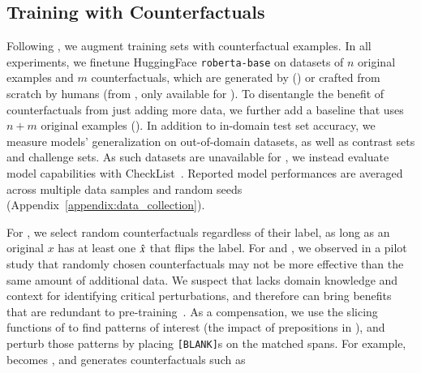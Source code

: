\subsection{Training with Counterfactuals}

\label{subsec:augmentation}
Following \citet{kaushik2019learning}, we augment training sets with counterfactual examples.
In all experiments, we finetune HuggingFace \texttt{roberta-base} on datasets of $n$ original examples and $m$ counterfactuals, which are generated by \sysname (\maug) or crafted from scratch by humans (\mcad from \citet{kaushik2019learning}, only available for \nli). To disentangle the benefit of counterfactuals from just adding more data, we further add a baseline that uses $n+m$ original examples (\mcomp).
In addition to in-domain test set accuracy, we measure models' generalization on out-of-domain datasets, as well as contrast sets and challenge sets. As such datasets are unavailable for \qqp, we instead evaluate model capabilities with CheckList~\cite{checklist:acl20}.
Reported model performances are averaged across multiple data samples and random seeds (Appendix~\ref{appendix:data_collection}).



For \sst, we select random \sysname counterfactuals regardless of their label, as long as an original $x$ has at least one $\hat{x}$ that flips the label.
For \nli and \qqp, we observed in a pilot study that randomly chosen counterfactuals may not be more effective than the same amount of additional data.
We suspect that \sysname lacks domain knowledge and context for identifying critical perturbations, and therefore can bring benefits that are redundant to pre-training~\cite{longpre2020effective}.
As a compensation, we use the slicing functions of \citet{chen2019slice} to find patterns of interest (\eg the impact of prepositions in \nli), and perturb those patterns by placing \texttt{[BLANK]}s on the matched spans. For example,  becomes , and \sysname generates counterfactuals such as 


